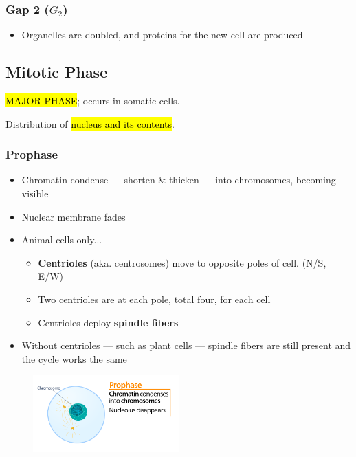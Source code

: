 \documentclass[a4paper,12pt]{article}
\begin{document}
\subsubsection{Gap 2 ($G_2$)}
\begin{itemize}
    \item{Organelles are doubled, and proteins for the new cell are produced}
\end{itemize}

\pagebreak

\subsection{Mitotic Phase}\noindent

\hl{MAJOR PHASE}; occurs in somatic cells.

Distribution of \hl{nucleus and its contents}.

\subsubsection{Prophase}
\begin{itemize}
    \item{Chromatin condense --- shorten \& thicken --- into chromosomes, becoming visible}
    \item{Nuclear membrane fades}
    \item{
            Animal cells only...
            \begin{itemize}
                \item{\textbf{Centrioles} (aka. centrosomes) move to opposite poles of cell. (N/S, E/W)}
                \item{Two centrioles are at each pole, total four, for each cell}
                \item{Centrioles deploy \textbf{spindle fibers}}
            \end{itemize}
        }
    \item{Without centrioles --- such as plant cells --- spindle fibers are still present and the cycle works the same}
\end{itemize}

\begin{figure}[H]
    \centering
    \includegraphics[width=0.5\textwidth]{prophase}
\end{figure}
\end{document}
